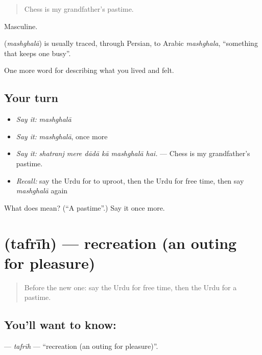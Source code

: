\begin{quote}
Chess is my grandfather's pastime.
\end{quote}

Masculine.

\begin{cousinweb}
\textbf{} (\emph{mashghalā}) is usually traced, through Persian, to Arabic \emph{mashghala}, \textquotedblleft{}something that keeps one busy\textquotedblright{}.
\end{cousinweb}

\begin{grammarlens}[title={What you've built}]
One more word for describing what you lived and felt.
\end{grammarlens}

\subsection*{Your turn}
\begin{itemize}
\raggedright
  \item \emph{Say it:} \emph{mashghalā}
  \item \emph{Say it:} \emph{mashghalā}, once more
  \item \emph{Say it:} \emph{shatranj mere dādā kā mashghalā hai.} — Chess is my grandfather's pastime.
  \item \emph{Recall:} say the Urdu for to uproot, then the Urdu for free time, then say \emph{mashghalā} again
\end{itemize}

\begin{tcolorbox}[breakable,colback=teal!4,colframe=teal!35!black,title={Before you move on}]
What does  mean? (\textquotedblleft{}A pastime\textquotedblright{}.) Say it once more.
\end{tcolorbox}
\section[\texorpdfstring{\ur{تفریح} (tafrīh)}{تفریح (tafrīh)}]{ (tafrīh) — recreation (an outing for pleasure)}

\label{lesson:UR-C513-tafrih}



\begin{quote}
Before the new one: say the Urdu for free time, then the Urdu for a pastime.
\end{quote}

\subsection*{You'll want to know: }
\textbf{} — \emph{tafrīh} — \textquotedblleft{}recreation (an outing for pleasure)\textquotedblright{}.

